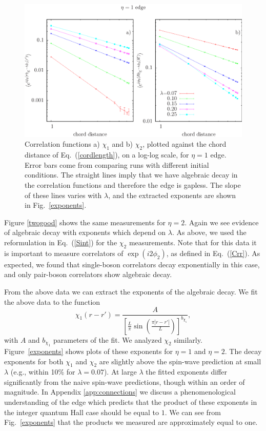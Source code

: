 \begin{figure}
\includegraphics[width=\linewidth]{figures/onecord.eps}
\caption{ Correlation functions a) $\chi_1$ and b) $\chi_2$, plotted against the chord distance of Eq.~(\ref{cordlength}), on a log-log scale, for $\eta=1$ edge.  Error bars come from comparing runs with different initial conditions.  The straight lines imply that we have algebraic decay in the correlation functions and therefore the edge is gapless.  The slope of these lines varies with $\lambda$, and the extracted exponents are shown in Fig.~\ref{exponents}.}
\label{onegood}
\end{figure}

Figure \ref{twogood} shows the same measurements for $\eta=2$. Again we see evidence of algebraic decay with exponents which depend on $\lambda$. As above, we used the reformulation in Eq.~(\ref{Sint}) for the $\chi_2$ measurements. Note that for this data it is important to measure correlators of $\exp(i2\phi_2)$, as defined in Eq.~(\ref{Crr}). As expected, we found that single-boson correlators decay exponentially in this case, and only pair-boson correlators show algebraic decay.


From the above data we can extract the exponents of the algebraic decay. We fit the above data to the function
\begin{equation}
\chi_1(r-r')=\frac{A}{\left[\frac{L}{\pi}\sin\left(\frac{\pi|r-r'|}{L}\right)\right]^{b_{\chi_1}}},
\label{fitfunction}
\end{equation}
with $A$ and $b_{\chi_1}$ parameters of the fit. We analyzed $\chi_2$ similarly.  Figure~\ref{exponents} shows plots of these exponents for $\eta=1$ and $\eta=2$. The decay exponents for both $\chi_1$ and $\chi_2$ are slightly above the spin-wave prediction at small $\lambda$ (e.g., within 10\% for $\lambda =0.07$). At large $\lambda$ the fitted exponents differ significantly from the naive spin-wave predictions, though within an order of magnitude. In Appendix \ref{app:connections} we discuss a phenomenological understanding of the edge which predicts that the product of these exponents in the integer quantum Hall case should be equal to $1$. We can see from Fig.~\ref{exponents} that the products we measured are approximately equal to one.

